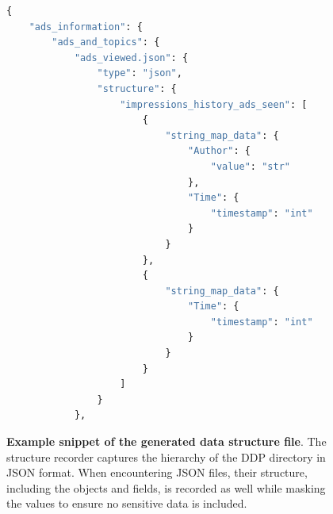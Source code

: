 \documentclass{DESSThesis}
\begin{document}
\begin{figure}[H]
\begin{lstlisting}[language=Python]
{
    "ads_information": {
        "ads_and_topics": {
            "ads_viewed.json": {
                "type": "json",
                "structure": {
                    "impressions_history_ads_seen": [
                        {
                            "string_map_data": {
                                "Author": {
                                    "value": "str"
                                },
                                "Time": {
                                    "timestamp": "int"
                                }
                            }
                        },
                        {
                            "string_map_data": {
                                "Time": {
                                    "timestamp": "int"
                                }
                            }
                        }
                    ]
                }
            },
\end{lstlisting}
\caption[Example snippet of the generated data structure file]{\textbf{Example snippet of the generated data structure file}. The structure recorder captures the hierarchy of the DDP directory in JSON format. When encountering JSON files, their structure, including the objects and fields, is recorded as well while masking the values to ensure no sensitive data is included.}
\label{fig:data_structure_snippet}
\end{figure}
\end{document}
